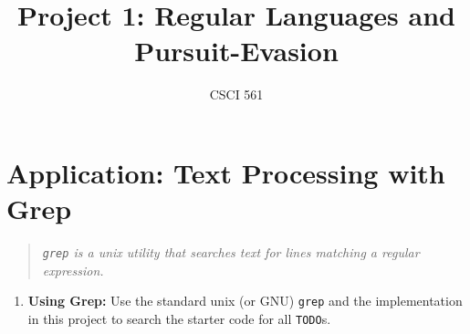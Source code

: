\documentclass[12pt,letterpaper]{ntdhw}
\title{Project 1: Regular Languages and Pursuit-Evasion}
\author{CSCI 561}
\begin{document}
\pagestyle{fancyplain}

\maketitle
\thispagestyle{fancyplain}

\section*{Application: Text Processing with Grep}

\begin{quote}
  \emph{\texttt{grep} is a unix utility that searches text for lines
    matching a regular expression.}
\end{quote}

\begin{enumerate}
  \item \textbf{Using Grep:} Use the standard unix (or GNU)
  \texttt{grep} and the implementation in this project to search the
  starter code for all \texttt{TODO}s.


\end{enumerate}
\end{document}
